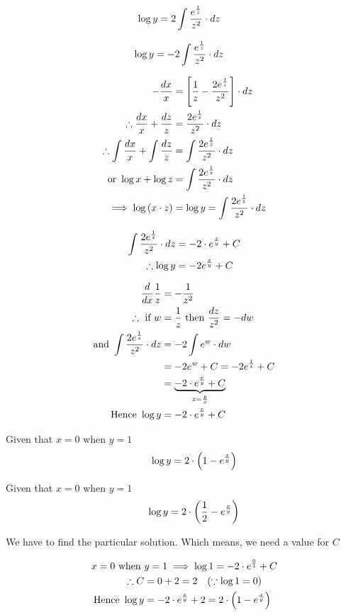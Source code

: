 \documentclass[14pt,fleqn]{extarticle}
\begin{document}
\newcard 

\begin{align}
\log y &= 2 \int \frac{e^{\frac{1}{z}}}{z^2}\cdot dz  
\end{align}

\newcard 

\begin{align}
\log y &= -2\int \frac{e^{\frac{1}{z}}}{z^2}\cdot dz 
\end{align}

\newcard 

\begin{align}
-\frac{dx}{x} &= \left[\frac{1}{z} - \frac{2e^{\frac{1}{z}}}{z^2} \right]\cdot dz \\
\therefore \frac{dx}{x} + \frac{dz}{z} &= \frac{2e^{\frac{1}{z}}}{z^2}\cdot dz \\
\therefore \int \frac{dx}{x} + \int \frac{dz}{z} &= \int \frac{2e^{\frac{1}{z}}}{z^2}\cdot dz \\
\text{or } \log x + \log z &= \int \frac{2e^{\frac{1}{z}}}{z^2}\cdot dz  \\
\implies \log \left(x\cdot z \right) &= \log y = \int \frac{2e^{\frac{1}{z}}}{z^2}\cdot dz 
\end{align}

\newcard 

\begin{align}
\int \frac{2e^{\frac{1}{z}}}{z^2}\cdot dz &= -2\cdot e^{\frac{x}{y}} + C \\
\therefore \log y &= -2e^{\frac{x}{y}} + C 
\end{align}

\newcard 

\begin{align}
\frac{d}{dx}\frac{1}{z} &= -\frac{1}{z^2} \\
\therefore\text{ if }w &= \frac{1}{z}\text{ then } \frac{dz}{z^2} = -dw \\
\text{and } \int \frac{2e^{\frac{1}{z}}}{z^2}\cdot dz &= -2\int e^w\cdot dw \\
&= -2 e^w + C = -2e^{\frac{1}{z}} + C\\
&= \underbrace{-2\cdot e^{\frac{x}{y}} + C }_{z = \frac{y}{x}} \\
\text{Hence } \log y &= -2\cdot e^{\frac{x}{y}} + C 
\end{align}

\newcard 

Given that $x=0$ when $y=1$ 
\[\qquad \log y = 2\cdot \left(1 - e^{\frac{x}{y}}\right)\]

\newcard 
Given that $x=0$ when $y=1$ 
\[\qquad \log y = 2\cdot \left(\frac{1}{2} - e^{\frac{x}{y}}\right)\]

\newcard 

We have to find the particular solution. Which means, we need a value for $C$

\begin{align}
x =0\text{ when } &y = 1 \implies \log 1 = -2\cdot e^{\frac{0}{1}} + C \\
\therefore C &= 0 + 2 = 2 \quad (\because \log 1 = 0) \\
\text{Hence } \log y &= -2\cdot e^{\frac{x}{y}} + 2 = 2\cdot \left(1-e^{\frac{x}{y}} \right)
\end{align}
\end{document}
